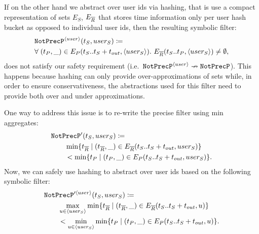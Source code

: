 If on the other hand we abstract over user ids via hashing, that is
use a compact representation of sets $E_S$, $E_{\overline{R}}$ that stores time
information only per user hash bucket as opposed to individual user ids, then
the resulting symbolic filter:
\begin{align*}
&
\NotPrecedesP^{\hashid{user}}(t_S, user_S) \coloneq 
\\
&
\forall\; (t_P, \_) \in E_P(t_S..t_S + t_{out}, \hashid{user_S}) .\ 
E_{\oR}(t_S..t_P, \hashid{user_S}) \neq \emptyset ,
\end{align*}
does not satisfy our safety requirement 
(i.e.\ $\texttt{NotPrecP}^{\langle user \rangle} \nrightarrow \texttt{NotPrecP}$).
This happens because hashing can only provide over-approximations of sets while,
in order to ensure conservativeness, the abstractions used for this filter need
to provide both over and under approximations.

One way to address this issue is to re-write the precise filter using min
aggregates:
\begin{align*}
&
\texttt{NotPrecP}'(t_S, user_S) \coloneq 
\\
&\qquad
\min \{ t_{\overline{R}} \mid (t_{\overline{R}}, \_) \in E_{\overline{R}}(t_S..t_S + t_{out}, user_S) \}
\\
&\qquad
< \min \{ t_P \mid (t_P, \_) \in E_P(t_S..t_S + t_{out}, user_S) \}.
\end{align*}
Now, we can safely use hashing to abstract over user ids based on the following
symbolic filter:
\begin{align*}
&
\texttt{NotPrecP}'^{\langle user \rangle}(t_S, user_S) \coloneq 
\\
&\qquad
\max_{u \in \langle user_S \rangle}
\min \{ t_{\overline{R}} \mid (t_{\overline{R}}, \_) \in E_{\overline{R}}(t_S..t_S + t_{out}, u) \}
\\
&\qquad
< 
\min_{u \in \langle user_S \rangle}
\min \{ t_P \mid (t_P, \_) \in E_P(t_S..t_S + t_{out}, u) \}.
\end{align*}


